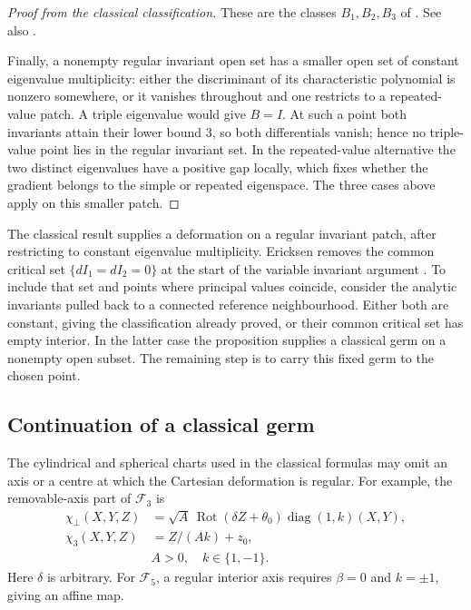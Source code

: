 \documentclass[11pt,a4paper]{article}
\numberwithin{equation}{section}
\theoremstyle{plain}
\theoremstyle{definition}
\theoremstyle{remark}
\begin{document}
\begin{proof}[Proof from the classical classification]
These are the classes $B_1,B_2,B_3$ of
\cite[p.~106]{MartinCarlson1976}. See also
\cite[Theorem 1.2, pp.~138 and 159]{MarrisShiau1970}.

Finally, a nonempty regular invariant open set has a smaller open set
of constant eigenvalue multiplicity: either the discriminant of its characteristic polynomial
is nonzero somewhere, or it vanishes throughout and one restricts
to a repeated-value patch. A triple eigenvalue would give $B=I$.
At such a point both invariants attain their lower bound $3$, so
both differentials vanish; hence no triple-value point lies in the
regular invariant set. In the repeated-value alternative the two
distinct eigenvalues have a positive gap locally, which fixes whether
the gradient belongs to the simple or repeated eigenspace. The three
cases above apply on this smaller patch.
\end{proof}

The classical result supplies a deformation on a regular invariant
patch, after restricting to constant eigenvalue multiplicity.
Ericksen removes the common critical set $\{dI_1=dI_2=0\}$ at the
start of the variable invariant argument \cite[p.~469]{Ericksen1954}.
To include that set and points where principal values coincide, consider the analytic
invariants pulled back to a connected reference neighbourhood.
Either both are constant, giving the classification already proved,
or their common critical set has empty interior. In the latter case
the proposition supplies a classical germ on a nonempty open subset.
The remaining step is to carry this fixed germ to the chosen point.

\subsection{Continuation of a classical germ}\label{completion:continuationsection}

The cylindrical and spherical charts used in the classical formulas
may omit an axis or a centre at which the Cartesian deformation is
regular.
For example, the removable-axis part of $\mathcal F_3$ is
\begin{equation}\label{intro:twisted-axis}
 \begin{aligned}
 \chi_\perp(X,Y,Z)&=\sqrt A\,\operatorname{Rot}(\delta Z+\theta_0)
                  \operatorname{diag}(1,k)(X,Y),\\
 \chi_3(X,Y,Z)&=Z/(Ak)+z_0,\\
 &A>0,\quad k\in\{1,-1\}.
 \end{aligned}
\end{equation}
Here $\delta$ is arbitrary. For $\mathcal F_5$, a regular interior axis
requires $\beta=0$ and $k=\pm1$, giving an affine map.
\end{document}
